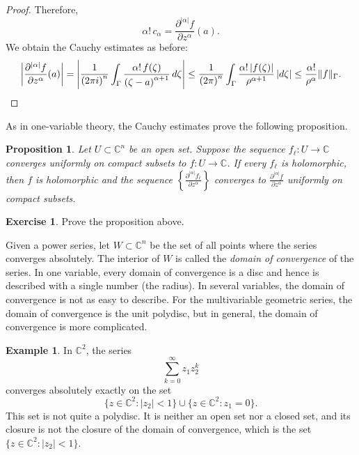 \documentclass[12pt,openany]{book}
\newcommand{\sabs}[1]{\lvert {#1} \rvert}
\newcommand{\snorm}[1]{\lVert {#1} \rVert}
\newcommand{\abs}[1]{\left\lvert {#1} \right\rvert}
\newcommand{\C}{{\mathbb{C}}}
\newcommand{\myindex}[1]{#1\index{#1}}
\theoremstyle{plain}
\newtheorem{prop}[thm]{Proposition}
\theoremstyle{remark}
\theoremstyle{definition}
\newenvironment{exbox}{%
    \def\FrameCommand{\vrule width 1pt \relax\hspace{10pt}}%
    \MakeFramed{\advance\hsize-\width\FrameRestore}%
}{%
    \endMakeFramed
}
\theoremstyle{exercise}
\newtheorem{exercise}{Exercise}[section]
\theoremstyle{example}
\newtheorem{example}[thm]{Example}
\begin{document}
\begin{proof}
Therefore,
\begin{equation*}
\alpha! \, c_\alpha =
\frac{\partial^{\sabs{\alpha}} f}{\partial z^\alpha} (a) .
\end{equation*}
We obtain the Cauchy estimates as before:
\begin{equation*}
\abs{\frac{\partial^{\sabs{\alpha}}f}{\partial z^\alpha}(a)}
=
\abs{
\frac{1}{{(2\pi i)}^n}
\int_{\Gamma}
\frac{\alpha! \, f(\zeta)}{{(\zeta-a)}^{\alpha+1}}
\,
d \zeta }
\leq
\frac{1}{{(2\pi)}^n}
\int_{\Gamma}
\frac{\alpha! \, \sabs{f(\zeta)}}{\rho^{\alpha+1}}
\,
\sabs{d \zeta}
\leq
\frac{\alpha!}{\rho^\alpha}
\snorm{f}_\Gamma . \qedhere
\end{equation*}
\end{proof}

As in one-variable theory, the Cauchy estimates prove the following
proposition.

\begin{prop}
Let $U \subset \C^n$ be an open set.
Suppose the sequence $f_\ell \colon U \to \C$ converges uniformly on compact subsets
to $f \colon U \to \C$.  If every $f_\ell$ is holomorphic, then $f$ is
holomorphic and the sequence
$\left\{ \frac{\partial^{\sabs{\alpha}} f_\ell}{\partial z^\alpha}\right\}$
converges to
$\frac{\partial^{\sabs{\alpha}} f}{\partial z^\alpha}$ uniformly on compact
subsets.
\end{prop}

\begin{exbox}
\begin{exercise}
Prove the proposition above.
\end{exercise}
\end{exbox}

Given a power series,
let $W \subset \C^n$ be the set of all points where the series
converges absolutely.
The interior of $W$ is called the
\emph{\myindex{domain of convergence}} of the series.
In one variable, every domain of convergence is a disc and hence is
described with a single number (the radius).
In several variables, the domain of convergence
is not as easy to describe.
For the multivariable geometric series,
the domain of convergence is the unit polydisc,
but in general, the domain of convergence is more complicated.

\begin{example}
In $\C^2$, the series
\begin{equation*}
\sum_{k=0}^\infty z_1 z_2^k
\end{equation*}
converges absolutely exactly on the set
\begin{equation*}
\bigl\{ z \in \C^2 : \sabs{z_2} < 1 \bigr\}
\cup
\bigl\{ z \in \C^2 : z_1 = 0 \bigr\} .
\end{equation*}
This set is not quite a polydisc.  It is neither an open set nor a closed set,
and its closure is not the closure of the domain of convergence,
which is the set $\bigl\{ z \in \C^2 : \sabs{z_2} < 1 \bigr\}$.
\end{example}
\end{document}

